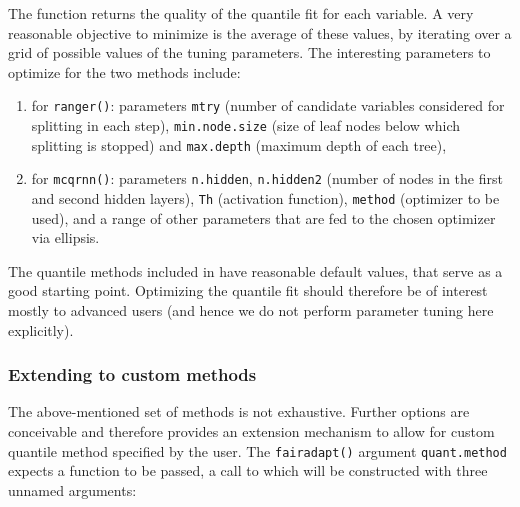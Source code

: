 \documentclass[
  nojss]{jss}
\providecommand{\tightlist}{%
  \setlength{\itemsep}{0pt}\setlength{\parskip}{0pt}}
\begin{document}
The function returns the quality of the quantile fit for each variable.
A very reasonable objective to minimize is the average of these values,
by iterating over a grid of possible values of the tuning parameters.
The interesting parameters to optimize for the two methods include:

\begin{enumerate}
\def\labelenumi{(\roman{enumi})}
\tightlist
\item
  for \texttt{ranger()}: parameters \texttt{mtry} (number of candidate
  variables considered for splitting in each step),
  \texttt{min.node.size} (size of leaf nodes below which splitting is
  stopped) and \texttt{max.depth} (maximum depth of each tree),
\item
  for \texttt{mcqrnn()}: parameters \texttt{n.hidden},
  \texttt{n.hidden2} (number of nodes in the first and second hidden
  layers), \texttt{Th} (activation function), \texttt{method} (optimizer
  to be used), and a range of other parameters that are fed to the
  chosen optimizer via ellipsis.
\end{enumerate}

The quantile methods included in  have reasonable default
values, that serve as a good starting point. Optimizing the quantile fit
should therefore be of interest mostly to advanced users (and hence we
do not perform parameter tuning here explicitly).

\hypertarget{extending-to-custom-methods}{%
\subsubsection{Extending to custom
methods}\label{extending-to-custom-methods}}

The above-mentioned set of methods is not exhaustive. Further options
are conceivable and therefore  provides an extension
mechanism to allow for custom quantile method specified by the user. The
\texttt{fairadapt()} argument \texttt{quant.method} expects a function
to be passed, a call to which will be constructed with three unnamed
arguments:
\end{document}
